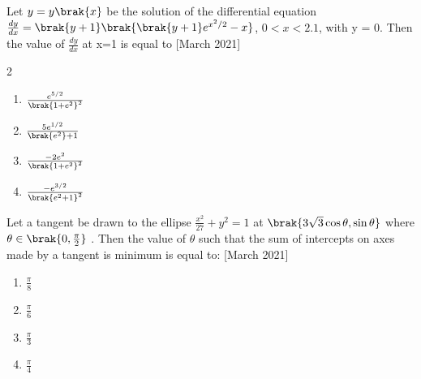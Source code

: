 \item Let $y=y\brak{x}$ be the solution of the differential equation $\frac{dy}{dx} =\brak{y+1}\brak{\brak{y+1}e^{x^2/2}-x}$, $0<x<2.1$, with y = 0. Then the value of $\frac{dy}{dx}$ at x=1 is equal to \hfill [March 2021]
\begin{multicols}{2}
\begin{enumerate}
    \item [a.] $\frac{e^{5/2}}{\brak{1+e^2}^2}$
    \item [b.] $\frac{5e^{1/2}}{\brak{e^2}+1}$
	    \columnbreak
    \item [c.] $\frac{-2e^2}{\brak{1+e^2}^2}$
    \item [d.] $\frac{-e^{3/2}}{\brak{e^2+1}^2}$
\end{enumerate}
\end{multicols}
\item Let a tangent be drawn to the ellipse $ \frac{x^2}{27} + y^2 = 1 $ at $ \brak{3\sqrt{3} \cos \theta, \sin \theta}$ where $\theta \in \brak{0, \frac{\pi}{2}}$ . Then the value of $\theta$  such that the sum of intercepts on axes made by a tangent is minimum is equal to: \hfill [March 2021]
\begin{enumerate}
    \item [a.] $\frac{\pi}{8}$
    \item [b.]  $\frac{\pi}{6}$
    \item [c.]  $\frac{\pi}{3}$
    \item [d.]  $\frac{\pi}{4}$
\end{enumerate}

